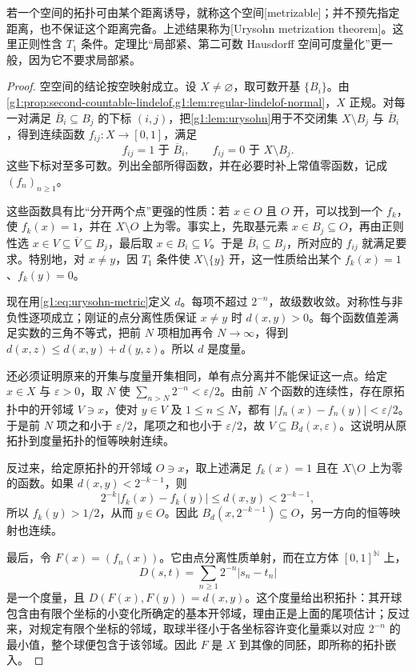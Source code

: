 若一个空间的拓扑可由某个距离诱导，就称这个空间[metrizable]；并不预先指定距离，也不保证这个距离完备。上述结果称为[Urysohn metrization theorem]。这里正则性含 \(T_1\) 条件。定理比“局部紧、第二可数 Hausdorff 空间可度量化”更一般，因为它不要求局部紧。

\begin{proof}
	空空间的结论按空映射成立。设 \(X\ne\varnothing\)，取可数开基 \(\{B_i\}\)。由\cref{g1:prop:second-countable-lindelof,g1:lem:regular-lindelof-normal}，\(X\) 正规。对每一对满足 \(\overline B_i\subseteq B_j\) 的下标 \((i,j)\)，把\cref{g1:lem:urysohn}用于不交闭集 \(X\setminus B_j\) 与 \(\overline B_i\)，得到连续函数 \(f_{ij}:X\to[0,1]\)，满足
	\[
		f_{ij}=1\text{ 于 }\overline B_i,\qquad
		f_{ij}=0\text{ 于 }X\setminus B_j.
	\]
	这些下标对至多可数。列出全部所得函数，并在必要时补上常值零函数，记成 \((f_n)_{n\ge1}\)。

	这些函数具有比“分开两个点”更强的性质：若 \(x\in O\) 且 \(O\) 开，可以找到一个 \(f_k\)，使 \(f_k(x)=1\)，并在 \(X\setminus O\) 上为零。事实上，先取基元素 \(x\in B_j\subseteq O\)，再由正则性选 \(x\in V\subseteq\overline V\subseteq B_j\)，最后取 \(x\in B_i\subseteq V\)。于是 \(\overline B_i\subseteq B_j\)，所对应的 \(f_{ij}\) 就满足要求。特别地，对 \(x\ne y\)，因 \(T_1\) 条件使 \(X\setminus\{y\}\) 开，这一性质给出某个 \(f_k(x)=1\)、\(f_k(y)=0\)。

	现在用\eqref{g1:eq:urysohn-metric}定义 \(d\)。每项不超过 \(2^{-n}\)，故级数收敛。对称性与非负性逐项成立；刚证的点分离性质保证 \(x\ne y\) 时 \(d(x,y)>0\)。每个函数值差满足实数的三角不等式，把前 \(N\) 项相加再令 \(N\to\infty\)，得到 \(d(x,z)\le d(x,y)+d(y,z)\)。所以 \(d\) 是度量。

	还必须证明原来的开集与度量开集相同，单有点分离并不能保证这一点。给定 \(x\in X\) 与 \(\varepsilon>0\)，取 \(N\) 使 \(\sum_{n>N}2^{-n}<\varepsilon/2\)。由前 \(N\) 个函数的连续性，存在原拓扑中的开邻域 \(V\ni x\)，使对 \(y\in V\) 及 \(1\le n\le N\)，都有 \(|f_n(x)-f_n(y)|<\varepsilon/2\)。于是前 \(N\) 项之和小于 \(\varepsilon/2\)，尾项之和也小于 \(\varepsilon/2\)，故 \(V\subseteq B_d(x,\varepsilon)\)。这说明从原拓扑到度量拓扑的恒等映射连续。

	反过来，给定原拓扑的开邻域 \(O\ni x\)，取上述满足 \(f_k(x)=1\) 且在 \(X\setminus O\) 上为零的函数。如果 \(d(x,y)<2^{-k-1}\)，则
	\[
		2^{-k}|f_k(x)-f_k(y)|\le d(x,y)<2^{-k-1},
	\]
	所以 \(f_k(y)>1/2\)，从而 \(y\in O\)。因此 \(B_d(x,2^{-k-1})\subseteq O\)，另一方向的恒等映射也连续。

	最后，令 \(F(x)=(f_n(x))\)。它由点分离性质单射，而在立方体 \([0,1]^{\mathbb N}\) 上，
	\[
		D(s,t)=\sum_{n\ge1}2^{-n}|s_n-t_n|
	\]
	是一个度量，且 \(D(F(x),F(y))=d(x,y)\)。这个度量给出积拓扑：其开球包含由有限个坐标的小变化所确定的基本开邻域，理由正是上面的尾项估计；反过来，对规定有限个坐标的邻域，取球半径小于各坐标容许变化量乘以对应 \(2^{-n}\) 的最小值，整个球便包含于该邻域。因此 \(F\) 是 \(X\) 到其像的同胚，即所称的拓扑嵌入。
\end{proof}

